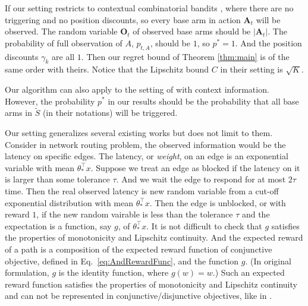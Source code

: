 \documentclass{article}
\newcommand{\bA}{\mathbf{A}}
\newcommand{\bO}{\mathbf{O}}
\begin{document}
If our setting restricts to contextual combinatorial bandits \cite{qin2014contextual}, where there are no triggering and no position discounts, so every base arm in action $\bA_t$ will be observed. The random variable $\bO_t$ of observed base arms should be $|\bA_t|$. The probability of full observation of $A$, $p_{t, A}$, should be $1$, so $p^{\ast} = 1$. And the position discounts $\gamma_k$ are all $1$. Then our regret bound of Theorem \ref{thm:main} is of the same order with theirs. Notice that the Lipschitz bound $C$ in their setting is $\sqrt{K}$.

Our algorithm can also apply to the setting of \cite{chen2013combinatorial} with context information. However, the probability $p^{\ast}$ in our results should be the probability that all base arms in $\tilde{S}$ (in their notations) will be triggered.

Our setting generalizes several existing works but does not limit to them. Consider in network routing problem, the observed information would be the latency on specific edges. The latency, or {\it weight}, on an edge is an exponential variable with mean $\theta_{\ast}^{\top}x$. Suppose we treat an edge as blocked if the latency on it is larger than some tolerance $\tau$. And we wait the edge to respond for at most $2\tau$ time. Then the real observed latency is new random variable from a cut-off exponential distribution with mean $\theta_{\ast}^{\top}x$. Then the edge is unblocked, or with reward $1$, if the new random vairable is less than the tolerance $\tau$ and the expectation is a function, say $g$, of $\theta_{\ast}^{\top}x$. It is not difficult to check that $g$ satisfies the properties of monotonicity and Lipschitz continuity. And the expected reward of a path is a composition of the expected reward function of conjunctive objective, defined in Eq.~\eqref{eq:AndRewardFunc}, and the function $g$. (In original formulation, $g$ is the identity function, where $g(w) = w$.) Such an expected reward function satisfies the properties of monotonicity and Lipschitz continuity and can not be represented in conjunctive/disjunctive objectives, like in \cite{kveton2015cascading,kveton2015combinatorial}.
\end{document}
